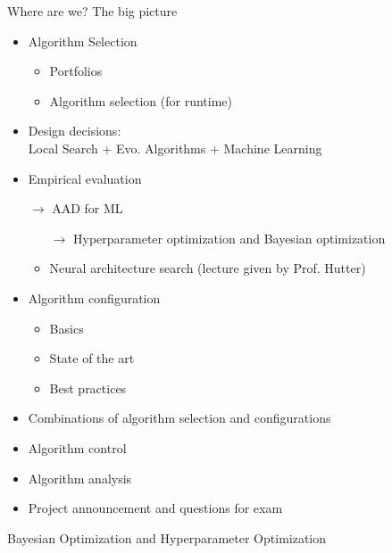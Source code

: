 \begin{frame}[c]{Where are we? The big picture}

\begin{itemize}
\item Algorithm Selection
  \begin{itemize}
    \item Portfolios
    \item Algorithm selection (for runtime)
  \end{itemize}
  \item Design decisions:\\ Local Search + Evo. Algorithms + Machine Learning 
  \item Empirical evaluation
  \item[$\to$] AAD for ML
  \begin{itemize}
    \item[$\to$] Hyperparameter optimization and Bayesian optimization 
    \item Neural architecture search (lecture given by Prof. Hutter)
  \end{itemize}
  \item Algorithm configuration 
  \begin{itemize}
    \item Basics 
    \item State of the art 
    \item Best practices 
  \end{itemize}
  \item Combinations of algorithm selection and configurations
  \item Algorithm control 
  \item Algorithm analysis 
  \item Project announcement and questions for exam 
\end{itemize}

\end{frame}
\begin{frame}[c]{}

\huge
\centering
Bayesian Optimization and Hyperparameter Optimization

\end{frame}
